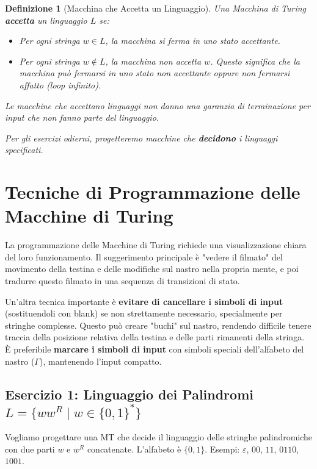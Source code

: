 \documentclass[a4paper]{article}
\newtheorem{definition}{Definizione}
\begin{document}
\begin{definition}[Macchina che Accetta un Linguaggio]
Una Macchina di Turing \textbf{accetta} un linguaggio $L$ se:
\begin{itemize}
    \item Per ogni stringa $w \in L$, la macchina si ferma in uno stato accettante.
    \item Per ogni stringa $w \notin L$, la macchina non accetta $w$. Questo significa che la macchina può fermarsi in uno stato non accettante oppure non fermarsi affatto (loop infinito).
\end{itemize}
Le macchine che accettano linguaggi non danno una garanzia di terminazione per input che non fanno parte del linguaggio.

Per gli esercizi odierni, progetteremo macchine che \textbf{decidono} i linguaggi specificati.
\end{definition}

\section{Tecniche di Programmazione delle Macchine di Turing}

La programmazione delle Macchine di Turing richiede una visualizzazione chiara del loro funzionamento. Il suggerimento principale è "vedere il filmato" del movimento della testina e delle modifiche sul nastro nella propria mente, e poi tradurre questo filmato in una sequenza di transizioni di stato.

Un'altra tecnica importante è \textbf{evitare di cancellare i simboli di input} (sostituendoli con blank) se non strettamente necessario, specialmente per stringhe complesse. Questo può creare "buchi" sul nastro, rendendo difficile tenere traccia della posizione relativa della testina e delle parti rimanenti della stringa. È preferibile \textbf{marcare i simboli di input} con simboli speciali dell'alfabeto del nastro ($\Gamma$), mantenendo l'input compatto.

\subsection{Esercizio 1: Linguaggio dei Palindromi $L = \{ww^R \mid w \in \{0,1\}^*\}$}

Vogliamo progettare una MT che decide il linguaggio delle stringhe palindromiche con due parti $w$ e $w^R$ concatenate. L'alfabeto è $\{0,1\}$. Esempi: $\varepsilon$, $00$, $11$, $0110$, $1001$.
\end{document}
